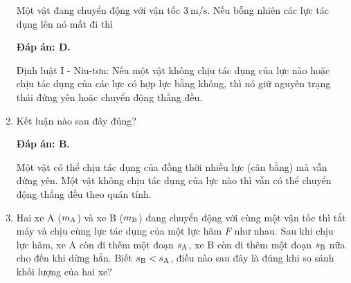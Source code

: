 \begin{enumerate}[label=\bfseries Câu \arabic*:]
	
	{Một vật đang chuyển động với vận tốc $3\ \text{m/s}$. Nếu bỗng nhiên các lực tác dụng lên nó mất đi thì
	}
	
	\hideall
	{	\textbf{Đáp án: D.}
		
		Định luật I - Niu-tơn: Nếu một vật không chịu tác dụng của lực nào hoặc chịu tác dụng của các lực có hợp lực bằng không, thì nó giữ nguyên trạng thái đứng yên hoặc chuyển động thẳng đều.
	}
	\item {}
	
	
	{Kết luận nào sau đây đúng?
	}
	
	\hideall
	{	\textbf{Đáp án: B.}
		
		Một vật có thể chịu tác dụng của đồng thời nhiều lực (cân bằng) mà vẫn đứng yên. Một vật không chịu tác dụng của lực nào thì vẫn có thể chuyển động thẳng đều theo quán tính.
	}
	\item {}
	
	
	{Hai xe A ($m_\text A$) và xe B ($m_\text B$) đang chuyển động với cùng một vận tốc thì tắt máy và chịu cùng lực tác dụng của một lực hãm $F$ như nhau. Sau khi chịu lực hãm, xe A còn đi thêm một đoạn $s_\text A$, xe B còn đi thêm một đoạn $s_\text B$ nữa cho đến khi dừng hẳn. Biết $s_\text B < s_\text A$, điều nào sau đây là đúng khi so sánh khối lượng của hai xe?
	}
	

\end{enumerate}
